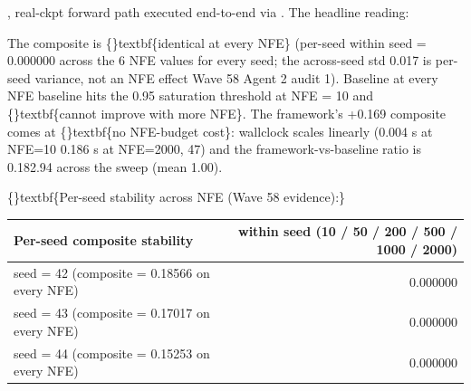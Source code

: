 \documentclass{article}
\begin{document}
, real-ckpt forward path executed end-to-end via . The headline reading:

\begin{table}[ht]
\centering
\small
{}%
\end{table}

The composite is \{\}textbf\{identical at every NFE\} (per-seed  within seed = 0.000000 across the 6 NFE values for every seed; the across-seed std 0.017 is per-seed variance, not an NFE effect  Wave 58 Agent 2 audit 1). Baseline  at every NFE  baseline hits the 0.95 saturation threshold at NFE = 10 and \{\}textbf\{cannot improve with more NFE\}. The framework's +0.169 composite comes at \{\}textbf\{no NFE-budget cost\}: wallclock scales linearly (0.004 s at NFE=10  0.186 s at NFE=2000,  47) and the framework-vs-baseline ratio is 0.182.94 across the sweep (mean  1.00).

\{\}textbf\{Per-seed stability across NFE (Wave 58 evidence):\}

\begin{table}[ht]
\centering
\small
\begin{tabular}{lr}
\hline
\textbf{Per-seed composite stability} & \textbf{ within seed (10 / 50 / 200 / 500 / 1000 / 2000)} \\
\hline
seed = 42 (composite = 0.18566 on every NFE) & 0.000000 \\
seed = 43 (composite = 0.17017 on every NFE) & 0.000000 \\
seed = 44 (composite = 0.15253 on every NFE) & 0.000000 \\
\hline
\end{tabular}
\end{table}
\end{document}
